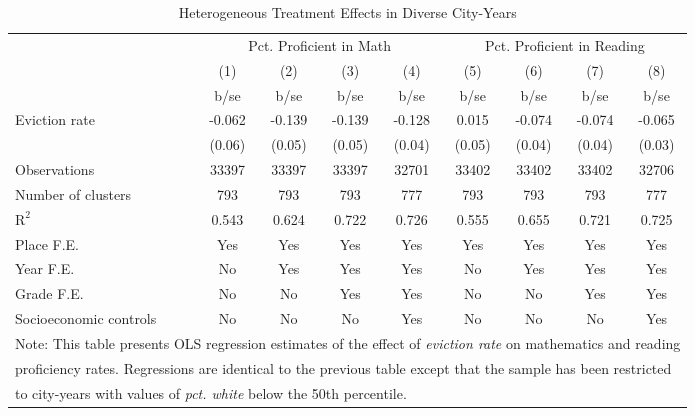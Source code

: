 \begin{table}[htbp]\centering
\def\sym#1{\ifmmode^{#1}\else\(^{#1}\)\fi}
\caption{Heterogeneous Treatment Effects in Diverse City-Years}
\begin{tabular}{l*{8}{c}}
\toprule
                    &\multicolumn{4}{c}{Pct. Proficient in Math}        &\multicolumn{4}{c}{Pct. Proficient in Reading}     \\\cmidrule(lr){2-5}\cmidrule(lr){6-9}
                    &\multicolumn{1}{c}{(1)}&\multicolumn{1}{c}{(2)}&\multicolumn{1}{c}{(3)}&\multicolumn{1}{c}{(4)}&\multicolumn{1}{c}{(5)}&\multicolumn{1}{c}{(6)}&\multicolumn{1}{c}{(7)}&\multicolumn{1}{c}{(8)}\\
                    &        b/se&        b/se&        b/se&        b/se&        b/se&        b/se&        b/se&        b/se\\
\midrule
Eviction rate       &      -0.062&      -0.139&      -0.139&      -0.128&       0.015&      -0.074&      -0.074&      -0.065\\
                    &      (0.06)&      (0.05)&      (0.05)&      (0.04)&      (0.05)&      (0.04)&      (0.04)&      (0.03)\\
\midrule
Observations        &       33397&       33397&       33397&       32701&       33402&       33402&       33402&       32706\\
Number of clusters  &         793&         793&         793&         777&         793&         793&         793&         777\\
$\text{R}^2$        &       0.543&       0.624&       0.722&       0.726&       0.555&       0.655&       0.721&       0.725\\
Place F.E.          &         Yes&         Yes&         Yes&         Yes&         Yes&         Yes&         Yes&         Yes\\
Year F.E.           &          No&         Yes&         Yes&         Yes&          No&         Yes&         Yes&         Yes\\
Grade F.E.          &          No&          No&         Yes&         Yes&          No&          No&         Yes&         Yes\\
Socioeconomic controls&          No&          No&          No&         Yes&          No&          No&          No&         Yes\\
\bottomrule
\multicolumn{9}{l}{\footnotesize Note: This table presents OLS regression estimates of the effect of \emph{eviction rate} on mathematics and reading}\\
\multicolumn{9}{l}{\footnotesize proficiency rates. Regressions are identical to the previous table except that the sample has been restricted}\\
\multicolumn{9}{l}{\footnotesize to city-years with values of \emph{pct. white} below the 50th percentile.}\\
\end{tabular}
\end{table}
